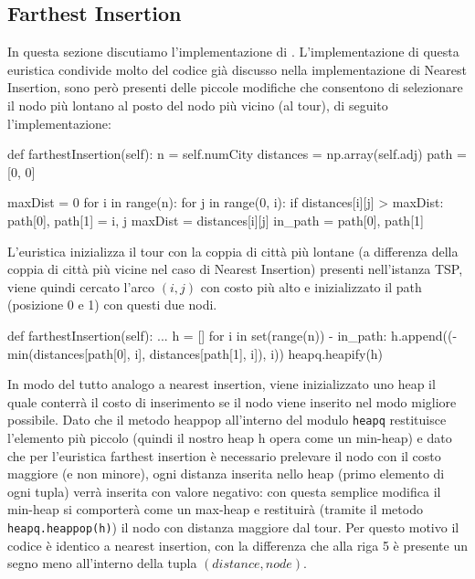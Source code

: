 \documentclass[a4paper,12pt]{report}
\begin{document}
\subsection{Farthest Insertion}
In questa sezione discutiamo l'implementazione di . L'implementazione di questa euristica condivide molto del codice già discusso nella implementazione di Nearest Insertion, sono però presenti delle piccole modifiche che consentono di selezionare il nodo più lontano al posto del nodo più vicino (al tour), di seguito l'implementazione:
\begin{python}
  def farthestInsertion(self):
    n = self.numCity
    distances = np.array(self.adj)
    path = [0, 0]
  
    maxDist = 0
      for i in range(n):
        for j in range(0, i):
          if distances[i][j] > maxDist:
            path[0], path[1] = i, j
            maxDist = distances[i][j]
      in_path = {path[0], path[1]}
  \end{python}
  L'euristica inizializza il tour con la coppia di città più lontane (a differenza della coppia di città più vicine nel caso di Nearest Insertion) presenti nell'istanza TSP, viene quindi cercato l'arco $(i, j)$ con costo più alto e inizializzato il path (posizione 0 e 1) con questi due nodi.
  \begin{python}
  def farthestInsertion(self):
    ...
    h = []
    for i in set(range(n)) - in_path:
      h.append((-min(distances[path[0], i], distances[path[1], i]), i))
    heapq.heapify(h)
  \end{python}
In modo del tutto analogo a nearest insertion, viene inizializzato uno heap il quale conterrà il costo di inserimento se il nodo viene inserito nel modo migliore possibile. Dato che il metodo heappop all'interno del modulo \lstinline!heapq! restituisce l'elemento più piccolo (quindi il nostro heap h opera come un min-heap) e dato che per l'euristica farthest insertion è necessario prelevare il nodo con il costo maggiore (e non minore), ogni distanza inserita nello heap (primo elemento di ogni tupla) verrà inserita con valore negativo: con questa semplice modifica il min-heap si comporterà come un max-heap e restituirà (tramite il metodo \lstinline!heapq.heappop(h)!) il nodo con distanza maggiore dal tour. Per questo motivo il codice è identico a nearest insertion, con la differenza che alla riga 5 è presente un segno meno all'interno della tupla $(distance, node)$.
\end{document}
